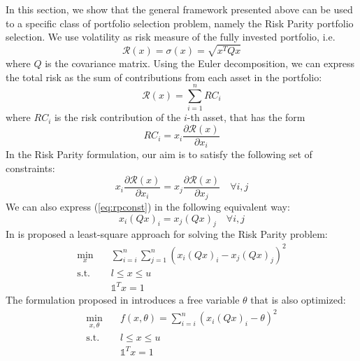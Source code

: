 In this section, we show that the general framework presented above can be used to a specific class of portfolio selection problem, namely the Risk Parity portfolio selection. We use volatility as risk measure of the fully invested portfolio, i.e.
\begin{equation}
\mathcal{R}(x) = \sigma(x) = \sqrt{x^T Q x}
\end{equation}
where $Q$ is the covariance matrix. Using the Euler decomposition, we can express the total risk as the sum of contributions from each asset in the portfolio:
\begin{equation}
\mathcal{R}(x) = \sum_{i=1}^n RC_i 
\end{equation}
where $RC_i$ is the risk contribution of the $i$-th asset, that has the form
\begin{equation}
RC_i = x_i \frac{\partial \mathcal{R}(x)}{\partial x_i}
\end{equation}
In the Risk Parity formulation, our aim is to satisfy the following set of constraints:
\begin{equation}\label{eq:rpconst}
x_i \frac{\partial \mathcal{R}(x)}{\partial x_i}= x_j \frac{\partial \mathcal{R}(x)}{\partial x_j} \quad \forall i,j
\end{equation}
We can also express (\ref{eq:rpconst}) in the following equivalent way:
\begin{equation}
x_i (Q x)_i = x_j (Q x)_j \quad \forall i,j
\end{equation}
In \cite{maillard} is proposed a least-square approach for solving the Risk Parity problem:
\begin{subequations}
\begin{align}
\min_x & \quad \sum_{i=i}^n \sum_{j=1}^{n}\left(x_i(Q x)_i - x_j(Q x)_j\right)^2\\
\text{s.t.} & \quad l \leq x \leq u \\
& \quad \mathds{1}^T x = 1 
\end{align}
\end{subequations}
The formulation proposed in \cite{tutuncu} introduces a free variable $\theta$ that is also optimized:
\begin{subequations}\label{eq:problemRP} 
\begin{align}
\min_{x,\theta} & \quad f(x,\theta) =  \sum_{i=i}^n \left(x_i(Q x)_i - \theta\right)^2 \\
\text{s.t.} & \quad l \leq x \leq u \\
& \quad \mathds{1}^T x = 1 
\end{align}
\end{subequations}
